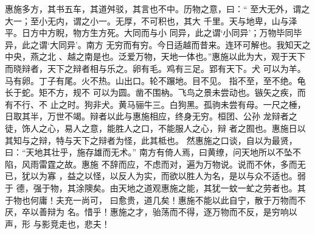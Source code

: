 \documentclass[a4paper,12pt,UTF8,twoside]{ctexbook}
\begin{document}
惠施多方，其书五车，其道舛驳，其言也不中。历物之意，曰：“ 至大无外，谓之大一；至小无内，谓之小一。无厚，不可积也，其大 千里。天与地卑，山与泽平。日方中方睨，物方生方死。大同而与小 同异，此之谓‘小同异’；万物毕同毕异，此之谓‘大同异’。南方 无穷而有穷。今日适越而昔来。连环可解也。我知天之中央，燕之北 、越之南是也。泛爱万物，天地一体也。”惠施以此为大，观于天下 而晓辩者，天下之辩者相与乐之。卵有毛。鸡有三足。郢有天下。犬 可以为羊。马有卵。丁子有尾。火不热。山出口。轮不蹍地。目不见。 指不至，至不绝。龟长于蛇。矩不方，规不 可以为圆。凿不围枘。飞鸟之景未尝动也。镞矢之疾，而有不行、不 止之时。狗非犬。黄马骊牛三。白狗黑。孤驹未尝有母。一尺之棰， 日取其半，万世不竭。辩者以此与惠施相应，终身无穷。桓团、公孙 龙辩者之徒，饰人之心，易人之意，能胜人之口，不能服人之心，辩 者之囿也。惠施日以其知与之辩，特与天下之辩者为怪，此其柢也。 然惠施之口谈，自以为最贤，曰：“天地其壮乎，施存雄而无术。” 南方有倚人焉，曰黄缭，问天地所以不坠不陷，风雨雷霆之故。惠施 不辞而应，不虑而对，遍为万物说。说而不休，多而无已，犹以为寡 ，益之以怪，以反人为实，而欲以胜人为名，是以与众不适也。弱于 德，强于物，其涂隩矣。由天地之道观惠施之能，其犹一蚊一虻之劳者也。其于物也何庸！夫充一尚可， 曰愈贵，道几矣！惠施不能以此自宁，散于万物而不厌，卒以善辩为 名。惜乎！惠施之才，骀荡而不得，逐万物而不反，是穷响以声，形 与影竞走也，悲夫！
\end{document}
